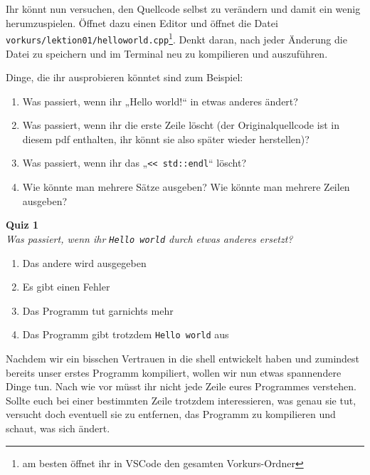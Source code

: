\newpage

\begin{spiel}

	Ihr könnt nun versuchen, den Quellcode selbst zu verändern und damit ein wenig
	herumzuspielen. Öffnet dazu einen Editor und öffnet die Datei
	\texttt{vorkurs/lektion01/helloworld.cpp}\footnote{am besten öffnet ihr in VSCode den gesamten Vorkurs-Ordner}. Denkt daran, nach jeder Änderung die Datei zu speichern und
	im Terminal neu zu kompilieren und auszuführen.

	Dinge, die ihr ausprobieren könntet sind zum Beispiel:
	\begin{enumerate}
		\item Was passiert, wenn ihr „Hello world!“ in etwas anderes ändert?
		\item Was passiert, wenn ihr die erste Zeile löscht (der Originalquellcode
		      ist in diesem pdf enthalten, ihr könnt sie also später wieder
		      herstellen)?
		\item Was passiert, wenn ihr das „\verb|<< std::endl|“ löscht?
		\item Wie könnte man mehrere Sätze ausgeben? Wie könnte man mehrere Zeilen
		      ausgeben?
	\end{enumerate}
\end{spiel}

\textbf{Quiz 1}\\
\textit{Was passiert, wenn ihr \texttt{Hello world} durch etwas anderes ersetzt?}
\begin{enumerate}[label=\alph*)]
	\item Das andere wird ausgegeben
	\item Es gibt einen Fehler
	\item Das Programm tut garnichts mehr
	\item Das Programm gibt trotzdem \texttt{Hello world} aus
\end{enumerate}


Nachdem wir ein bisschen Vertrauen in die shell entwickelt haben und zumindest
bereits unser erstes Programm kompiliert, wollen wir nun etwas spannendere
Dinge tun. Nach wie vor müsst ihr nicht jede Zeile eures Programmes verstehen.
Sollte euch bei einer bestimmten Zeile trotzdem interessieren, was genau sie
tut, versucht doch eventuell sie zu entfernen, das Programm zu kompilieren und
schaut, was sich ändert.

